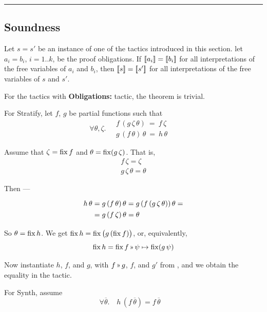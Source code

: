 \hrule
\bigskip


\subsection{Soundness}

\renewenvironment{proof}{\noindent{\bf Proof.~}}{}

\begin{theorem}
Let $s=s'$ be an instance of one of the tactics introduced in this section.
let $a_i=b_i$, $i=1..k$, be the proof obligations. If $[\![{a_i}]\!]=[\![{b_i}]\!]$
for all interpretations of the free variables of $a_i$ and $b_i$, then
$[\![{s}]\!]=[\![{s'}]\!]$ for all interpretations of the free variables of $s$ and $s'$.
\end{theorem}

\begin{proof}
For the tactics with {\bf Obligations:} tactic, the theorem is trivial.

\medskip
For Stratify, let $f$, $g$ be partial functions such that
\[\renewcommand\arraystretch{1.3}
  \forall \theta,\zeta.\quad \begin{array}{l}f\,(g\,\zeta\,\theta) ~=~ f\,\zeta \\
  g\,(f\,\theta)\,\theta ~=~ h\,\theta
  \end{array}\quad\]
  
Assume that $\zeta = \operatorname{fix} f$ and $\theta = \operatorname{fix} (g\,\zeta)$. That is,
\[\renewcommand\arraystretch{1.3}
  \begin{array}{l}
    f\,\zeta = \zeta\\
    g\,\zeta\,\theta = \theta
  \end{array}\]
  
Then ---
\[\renewcommand\arraystretch{1.3}
  \begin{array}{l@{}l}
   h\,\theta & {}= g\,(f\,\theta)\,\theta = g\,(f\,(g\,\zeta\,\theta))\,\theta = \\
             & {}= g\,(f\,\zeta)\,\theta = \theta
  \end{array}\]
  
So $\theta = \operatorname{fix} h$. We get $\operatorname{fix} h = \operatorname{fix} \big(g \,(\operatorname{fix} f)\big)$, or, equivalently,
\[\fix h = \fix f \applt \psi\mapsto\fix (g\,\psi)\]

Now instantiate $h$, $f$, and $g$, with $f\applt g$, $f$, and $g'$ from ,
and we obtain the equality in the tactic.

\medskip
For Synth, assume
\[\renewcommand\arraystretch{1.3}
  \forall \overline\theta.\quad h\,(f\,\overline\theta)=f\,\overline\theta \quad\]


\end{proof}
